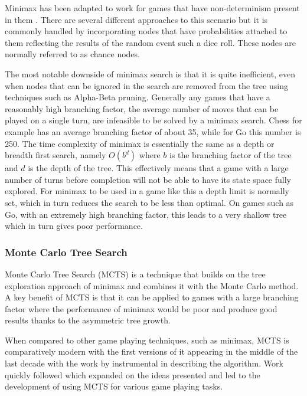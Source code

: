 \documentclass[]{article}
\begin{document}
\par Minimax has been adapted to work for games that have non-determinism present in them \autocite[133]{russell1995modern}. There are several different approaches to this scenario but it is commonly handled by incorporating nodes that have probabilities attached to them reflecting the results of the random event such a dice roll. These nodes are normally referred to as chance nodes.

\par The most notable downside of minimax search is that it is quite inefficient, even when nodes that can be ignored in the search are removed from the tree using techniques such as Alpha-Beta pruning. Generally any games that have a reasonably high branching factor, the average number of moves that can be played on a single turn, are infeasible to be solved by a minimax search. Chess for example has an average branching factor of about 35, while for Go this number is 250. The time complexity of minimax is essentially the same as a depth or breadth first search, namely $O(b^d)$ where $b$ is the branching factor of the tree and $d$ is the depth of the tree. This effectively means that a game with a large number of turns before completion will not be able to have its state space fully explored. For minimax to be used in a game like this a depth limit is normally set, which in turn reduces the search to be less than optimal. On games such as Go, with an extremely high branching factor, this leads to a very shallow tree which in turn gives poor performance.

\subsubsection{Monte Carlo Tree Search}
Monte Carlo Tree Search (MCTS) is a technique that builds on the tree exploration approach of minimax and combines it with the Monte Carlo method. A key benefit of MCTS is that it can be applied to games with a large branching factor where the performance of minimax would be poor and produce good results thanks to the asymmetric tree growth. 

\par When compared to other game playing techniques, such as minimax, MCTS is comparatively modern with the first versions of it appearing in the middle of the last decade with the work by \textcite{kocsis2006bandit} instrumental in describing the algorithm. Work quickly followed which expanded on the ideas presented and led to the development of using MCTS for various game playing tasks. 
\end{document}
